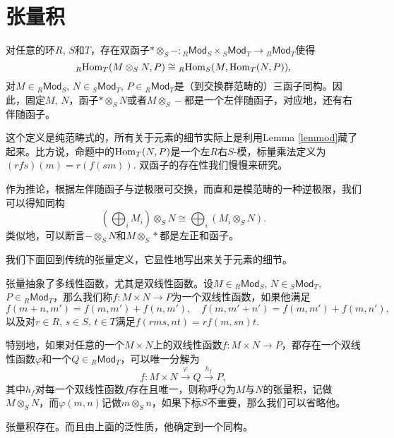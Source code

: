 \section{张量积}

\begin{thm}\label{thmten}
对任意的环$R$, $S$和$T$，存在双函子$*\otimes_S -:{}_R\mathsf{Mod}_S\times {}_S\mathsf{Mod}_T\to {}_R\mathsf{Mod}_T$使得
\[
	{}_R\!\operatorname{Hom}_{T}(M\otimes_S N,P)\cong {}_R\!\operatorname{Hom}_S(M,\operatorname{Hom}_{T}(N,P)),
\]
对$M\in {}_R\mathsf{Mod}_S$, $N\in {}_S\mathsf{Mod}_T$, $P\in {}_R\mathsf{Mod}_T$是（到交换群范畴的）三函子同构。因此，固定$M$, $N$，函子$*\otimes_S N$或者$M\otimes_S -$都是一个左伴随函子，对应地，还有右伴随函子。
\end{thm}

这个定义是纯范畴式的，所有关于元素的细节实际上是利用Lemma \ref{lemmod}藏了起来。比方说，命题中的$\operatorname{Hom}_{T}(N,P)$是一个左$R$右$S$-模，标量乘法定义为$(rfs)(m)=r(f(sm))$. 双函子的存在性我们慢慢来研究。

作为推论，根据左伴随函子与逆极限可交换，而直和是模范畴的一种逆极限，我们可以得知同构
\[
	\left(\bigoplus_i M_i\right)\otimes_S N\cong \bigoplus_i \left(M_i\otimes_S N\right).
\]
类似地，可以断言$-\otimes_S N$和$M\otimes_S *$都是左正和函子。

我们下面回到传统的张量定义，它显性地写出来关于元素的细节。

\para 张量抽象了多线性函数，尤其是双线性函数。设$M\in {}_R\mathsf{Mod}_S$, $N\in {}_S\mathsf{Mod}_T$, $P\in {}_R\mathsf{Mod}_T$，那么我们称$f:M\times N\to P$为一个双线性函数，如果他满足
\[
	f(m+n,m')=f(m,m')+f(n,m'),\quad f(m,m'+n')=f(m,m')+f(m,n'),
\]
以及对$r\in R$, $s\in S$, $t\in T$满足$f(rms,nt)=rf(m,sn)t$. 

特别地，如果对任意的一个$M\times N$上的双线性函数$f:M\times N\to P$，都存在一个双线性函数$\varphi$和一个$Q\in {}_R\mathsf{Mod}_T$，可以唯一分解为
\[
	f:M\times N\xrightarrow{\varphi} Q\xrightarrow{h_f}P,
\]
其中$h_f$对每一个双线性函数$f$存在且唯一，则称呼$Q$为$M$与$N$的张量积，记做$M\otimes_S N$，而$\varphi(m,n)$记做$m\otimes_S n$，如果下标$S$不重要，那么我们可以省略他。


\begin{lem}
张量积存在。而且由上面的泛性质，他确定到一个同构。
\end{lem}

